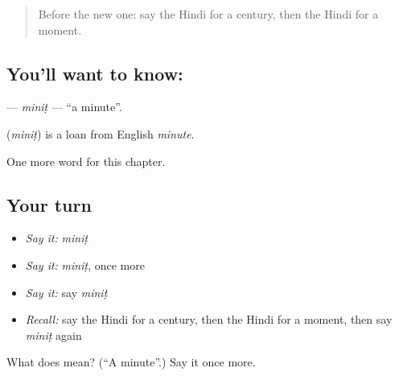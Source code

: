 \begin{quote}
Before the new one: say the Hindi for a century, then the Hindi for a moment.
\end{quote}

\subsection*{You'll want to know: }
\textbf{} — \emph{miniṭ} — \textquotedblleft{}a minute\textquotedblright{}.

\begin{cousinweb}
\textbf{} (\emph{miniṭ}) is a loan from English \emph{minute}.
\end{cousinweb}

\begin{grammarlens}[title={What you've built}]
One more word for this chapter.
\end{grammarlens}

\subsection*{Your turn}
\begin{itemize}
\raggedright
  \item \emph{Say it:} \emph{miniṭ}
  \item \emph{Say it:} \emph{miniṭ}, once more
  \item \emph{Say it:} say \emph{miniṭ}
  \item \emph{Recall:} say the Hindi for a century, then the Hindi for a moment, then say \emph{miniṭ} again
\end{itemize}

\begin{tcolorbox}[breakable,colback=teal!4,colframe=teal!35!black,title={Before you move on}]
What does  mean? (\textquotedblleft{}A minute\textquotedblright{}.) Say it once more.
\end{tcolorbox}
